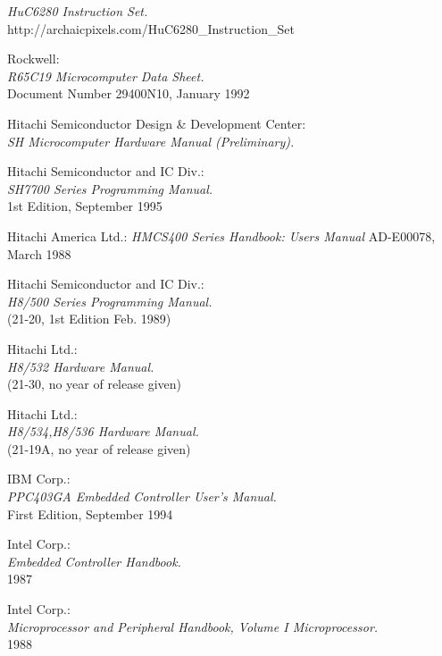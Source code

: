  {\em HuC6280 Instruction Set.\/} \\
                  http://archaicpixels.com/HuC6280_Instruction_Set

 Rockwell: \\
                {\em R65C19 Microcomputer Data Sheet.\/} \\
                Document Number 29400N10, January 1992

 Hitachi Semiconductor Design \& Development Center: \\
                 {\em SH Microcomputer Hardware Manual
                 (Preliminary).\/}

 Hitachi Semiconductor and IC Div.: \\
                 {\em SH7700 Series Programming Manual.\/} \\
                 1st Edition, September 1995

 Hitachi America Ltd.:
                 {\em HMCS400 Series Handbook: Users Manual\/}
                 AD-E00078, March 1988

 Hitachi Semiconductor and IC Div.: \\
                  {\em H8/500 Series Programming Manual.\/} \\
        	  (21-20, 1st Edition Feb. 1989)

 Hitachi Ltd.: \\
                    {\em H8/532 Hardware Manual.\/} \\
		    (21-30, no year of release given)

 Hitachi Ltd.: \\
                    {\em H8/534,H8/536 Hardware Manual.\/} \\
		    (21-19A, no year of release given)

 IBM Corp.: \\
	         {\em PPC403GA Embedded Controller User's Manual.\/} \\
                 First Edition, September 1994

 Intel Corp.: \\
                 {\em Embedded Controller Handbook.\/} \\
		 1987

 Intel Corp.: \\
                 {\em Microprocessor and Peripheral Handbook, Volume I
                 Microprocessor.\/} \\
                 1988

